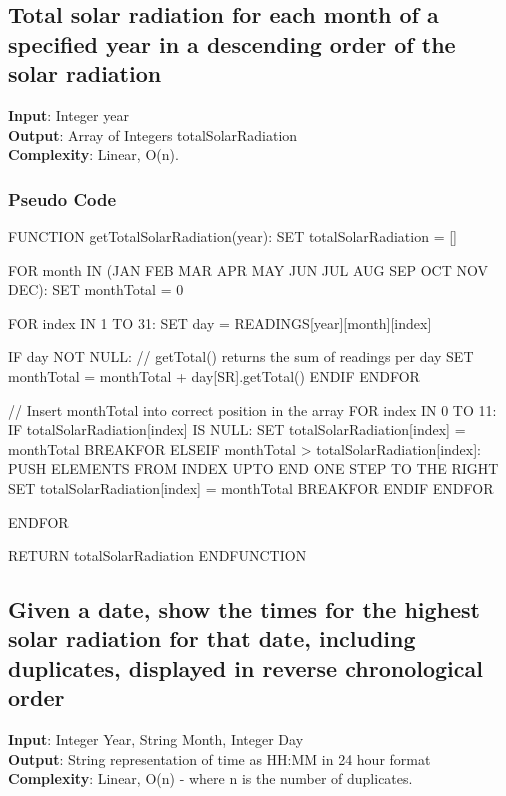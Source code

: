 \documentclass[12pt]{article}
\begin{document}
\subsection{Total solar radiation for each month of a specified year in a descending order of the solar radiation}
\textbf{Input}: Integer year \\
\textbf{Output}: Array of Integers totalSolarRadiation \\
\textbf{Complexity}: Linear, O(n).
\subsubsection{Pseudo Code}
\begin{algorithm}[caption={Return total solar radion of each month in a given year; in descending order.}, label=algo4]
	FUNCTION getTotalSolarRadiation(year):
	SET totalSolarRadiation = []
	
	FOR month IN (JAN FEB MAR APR MAY JUN JUL AUG SEP OCT NOV DEC):
	SET monthTotal = 0
	
	FOR index IN 1 TO 31:
	SET day = READINGS[year][month][index]
	
	IF day NOT NULL:
	// getTotal() returns the sum of readings per day
	SET monthTotal = monthTotal + day[SR].getTotal()
	ENDIF
	ENDFOR
	
	// Insert monthTotal into correct position in the array
	FOR index IN 0 TO 11:
	IF totalSolarRadiation[index] IS NULL:
	SET totalSolarRadiation[index] = monthTotal
	BREAKFOR
	ELSEIF monthTotal > totalSolarRadiation[index]:
	PUSH ELEMENTS FROM INDEX UPTO END ONE STEP TO THE RIGHT
	SET totalSolarRadiation[index] = monthTotal
	BREAKFOR
	ENDIF
	ENDFOR
	
	ENDFOR
	
	RETURN totalSolarRadiation
	ENDFUNCTION
\end{algorithm}
\subsection{Given a date, show the times for the highest solar radiation for that date, including duplicates, displayed in reverse chronological order}
\textbf{Input}: Integer Year, String Month, Integer Day \\
\textbf{Output}: String representation of time as HH:MM in 24 hour format \\
\textbf{Complexity}: Linear, O(n) - where n is the number of duplicates. \\
\end{document}
